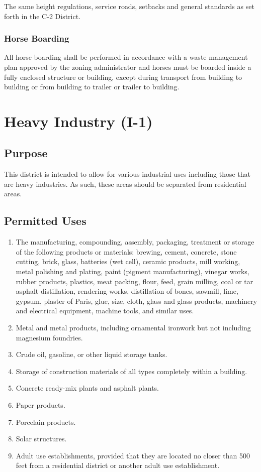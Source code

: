 \subsubsection{}
The same height regulations, service roads, setbacks and general standards as set forth in the C-2 District.
\subsubsection{Horse Boarding}
All horse boarding shall be performed in accordance with a waste management plan approved by the zoning administrator and horses must be boarded inside a fully enclosed structure or building, except during transport from building to building or from building to trailer or trailer to building.


\setcounter{section}{64}
\section{Heavy Industry (I-1)}
\subsection{Purpose}
This district is intended to allow for various industrial uses including those that are heavy industries. As such, these areas should be separated from residential areas.
\subsection{Permitted Uses}
\begin{enumerate}[{\indent}1)]
    \item The manufacturing, compounding, assembly, packaging, treatment or storage of the following products or materials: brewing, cement, concrete, stone cutting, brick, glass, batteries (wet cell), ceramic products, mill working, metal polishing and plating, paint (pigment manufacturing), vinegar works, rubber products, plastics, meat packing, flour, feed, grain milling, coal or tar asphalt distillation, rendering works, distillation of bones, sawmill, lime, gypsum, plaster of Paris, glue, size, cloth, glass and glass products, machinery and electrical equipment, machine tools, and similar uses.
    \item Metal and metal products, including ornamental ironwork but not including magnesium foundries.
    \item Crude oil, gasoline, or other liquid storage tanks.
    \item Storage of construction materials of all types completely within a building.
    \item Concrete ready-mix plants and asphalt plants.
    \item Paper products.
    \item Porcelain products.
    \item Solar structures.
    \item Adult use establishments, provided that they are located no closer than 500 feet from a residential district or another adult use establishment.
\end{enumerate}
